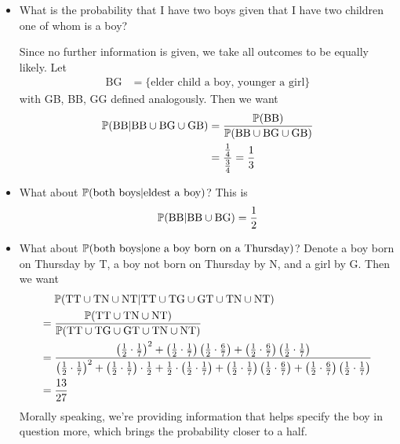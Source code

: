 \documentclass{../../template/note}
\begin{document}
    
    \begin{example*}
        \begin{itemize}
            \item What is the probability that I have two boys given that I have two children one of whom is a boy?
            
            Since no further information is given, we take all outcomes to be equally likely. Let
            \begin{align*}
                \text{BG} &= \{\text{elder child a boy, younger a girl}\}
            \end{align*}
            with GB, BB, GG defined analogously. Then we want
            \begin{align*}
                \mathbb P(\text{BB} |  \text{BB} \cup \text{BG} \cup \text{GB}) &= \frac{\mathbb P(\text{BB})}{\mathbb P(\text{BB} \cup \text{BG} \cup \text{GB})} \\
                &= \frac{\frac 1 4}{\frac 3 4} = \frac 1 3 
            \end{align*}
            \item What about \(\mathbb P(\text{both boys} | \text{eldest a boy})\)? This is
            \begin{align*}
                \mathbb P(\text{BB} |  \text{BB} \cup \text{BG}) = \frac 1 2
            \end{align*}
            \item What about \(\mathbb P(\text{both boys} | \text{one a boy born on a Thursday})\)?
            Denote a boy born on Thursday by T, a boy not born on Thursday by N, and a girl by G. Then we want
            \begin{align*}
                &\; \mathbb P(\text{TT} \cup \text{TN} \cup \text{NT} | \text{TT} \cup \text{TG} \cup \text{GT} \cup \text{TN} \cup \text{NT}) \\
                =&\; \frac{\mathbb P(\text{TT} \cup \text{TN} \cup \text{NT})}{\mathbb P(\text{TT} \cup \text{TG} \cup \text{GT} \cup \text{TN} \cup \text{NT})} \\
                =&\; \frac{\left(\frac 1 2 \cdot \frac 1 7\right)^2 + \left(\frac 1 2 \cdot \frac 1 7\right)\left(\frac 1 2 \cdot \frac 6 7\right) + \left(\frac 1 2 \cdot \frac 6 7\right)\left(\frac 1 2 \cdot \frac 1 7\right)}{\left(\frac 1 2 \cdot \frac 1 7\right)^2 + \left(\frac 1 2 \cdot \frac 1 7\right)\cdot \frac 1 2 + \frac 1 2 \cdot \left(\frac 1 2 \cdot \frac 1 7\right) + \left(\frac 1 2 \cdot \frac 1 7\right)\left(\frac 1 2 \cdot \frac 6 7\right) + \left(\frac 1 2 \cdot \frac 6 7\right)\left(\frac 1 2 \cdot \frac 1 7\right)} \\
                =&\; \frac{13}{27}
            \end{align*}
            Morally speaking, we're providing information that helps specify the boy in question more, which brings the probability closer to a half.
        \end{itemize}
    \end{example*}
    
\end{document}
